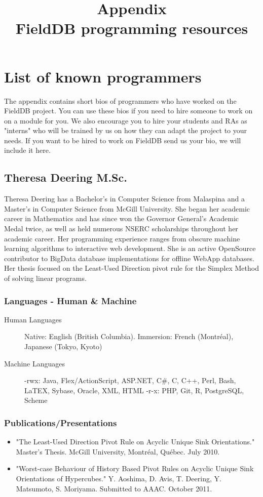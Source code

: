 \documentclass[12 pt]{article}
\title{Appendix \\  FieldDB programming resources}
\author{}
\date{}
\begin{document}
\maketitle{} 
\tableofcontents


\section {List of known programmers}

The appendix contains short bios of  programmers who have worked on the FieldDB project. You can use these bios if you need to hire someone to work on on a module for you. We also encourage you to hire your students and RAs as "interns" who will be trained by us on how they can adapt the project to your needs. If you want to be hired to work on FieldDB send us your bio, we will include it here.

\subsection{Theresa Deering M.Sc.}

Theresa Deering has a  Bachelor's in Computer Science from Malaspina and a Master's in Computer Science from McGill University. She began her academic career in Mathematics and has since won the Governor General's Academic Medal twice, as well as held numerous NSERC scholarships throughout her academic career. Her programming experience ranges from obscure machine learning algorithms to interactive web development.  She is an active OpenSource contributor to BigData database implementations for offline WebApp databases. Her thesis focused on the Least-Used Direction pivot rule for the Simplex Method of solving linear programs.


\subsubsection{Languages - Human \& Machine}
\begin{description}
\item [
Human Languages] Native: English (British Columbia). Immersion: French (Montr\'eal), Japanese (Tokyo, Kyoto)
\item [
Machine Languages] -rwx: Java, Flex/ActionScript, ASP.NET, C\#, C, C++, Perl, Bash, LaTEX, Sybase, Oracle, XML, HTML -r-x: PHP, Git, R, PostgreSQL, Scheme
\end{description}

\subsubsection{Publications/Presentations}
\begin{itemize}
\item "The Least-Used Direction Pivot Rule on Acyclic Unique Sink Orientations." Master's Thesis. McGill University, Montr\'eal, Qu\'ebec. July 2010.
\item "Worst-case Behaviour of History Based Pivot Rules on Acyclic Unique Sink Orientations of Hypercubes." Y. Aoshima, D. Avis, T. Deering, Y. Matsumoto, S. Moriyama. Submitted to AAAC. October 2011.
\end{itemize}
\end{document}
